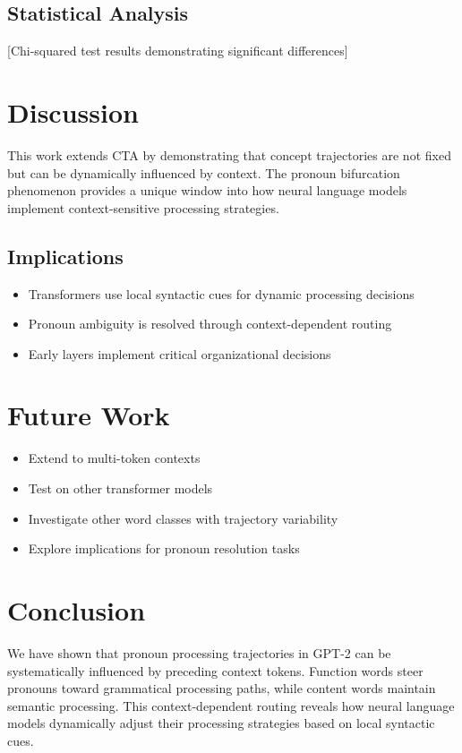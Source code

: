 \documentclass[11pt]{article}
\begin{document}
\subsection{Statistical Analysis}

[Chi-squared test results demonstrating significant differences]

\section{Discussion}

This work extends CTA by demonstrating that concept trajectories are not fixed but can be dynamically influenced by context. The pronoun bifurcation phenomenon provides a unique window into how neural language models implement context-sensitive processing strategies.

\subsection{Implications}

\begin{itemize}
\item Transformers use local syntactic cues for dynamic processing decisions
\item Pronoun ambiguity is resolved through context-dependent routing
\item Early layers implement critical organizational decisions
\end{itemize}

\section{Future Work}

\begin{itemize}
\item Extend to multi-token contexts
\item Test on other transformer models
\item Investigate other word classes with trajectory variability
\item Explore implications for pronoun resolution tasks
\end{itemize}

\section{Conclusion}

We have shown that pronoun processing trajectories in GPT-2 can be systematically influenced by preceding context tokens. Function words steer pronouns toward grammatical processing paths, while content words maintain semantic processing. This context-dependent routing reveals how neural language models dynamically adjust their processing strategies based on local syntactic cues.



\end{document}
